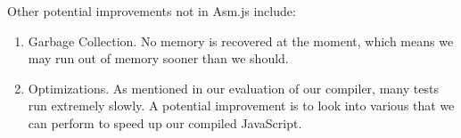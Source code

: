 \documentclass[twoside]{article}
\begin{document}
\begin{multicols}{2}
Other potential improvements not in Asm.js include:

\begin{enumerate}
  \item Garbage Collection. No memory is recovered at the moment, which means
    we may run out of memory sooner than we should.
  \item Optimizations. As mentioned in our evaluation of our compiler, many tests
    run extremely slowly. A potential improvement is to look into various
    that we can perform to speed up our compiled JavaScript.
\end{enumerate}


\end{multicols}
\end{document}
